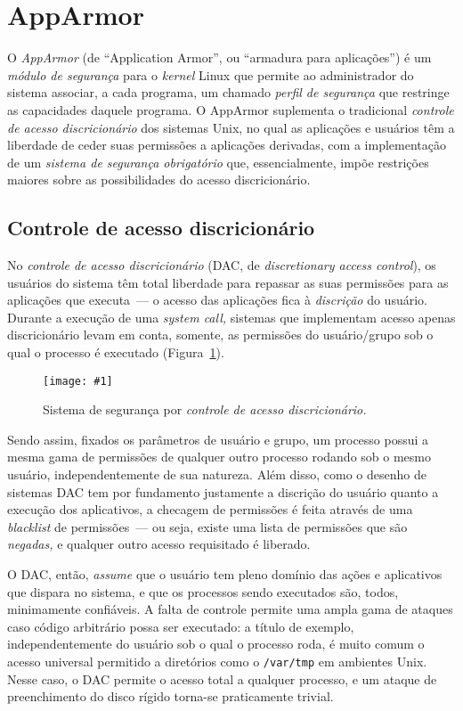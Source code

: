 \documentclass[ruledheader, 12pt]{abnt}
\newcommand{\figcustom}[4]{\par
	\begin{figure}[#3]
		\centering
		\texttt{[image: \#1]}
		\caption{\label{fig:#1}#2}
	\end{figure}
\par}
\newcommand{\figref}[1]{(Figura~\ref{fig:#1})}
\begin{document}
\section{AppArmor}

O \emph{AppArmor} (de ``Application Armor'', ou ``armadura para aplicações'') é um \emph{módulo de segurança} para o \emph{kernel} Linux que permite ao administrador do sistema associar, a cada programa, um chamado \emph{perfil de segurança} que restringe as capacidades daquele programa. O AppArmor suplementa o tradicional \emph{controle de acesso discricionário} dos sistemas Unix, no qual as aplicações e usuários têm a liberdade de ceder suas permissões a aplicações derivadas, com a implementação de um \emph{sistema de segurança obrigatório} que, essencialmente, impõe restrições maiores sobre as possibilidades do acesso discricionário.


\subsection{Controle de acesso discricionário}

No \emph{controle de acesso discricionário} (DAC, de \emph{discretionary access control}), os usuários do sistema têm total liberdade para repassar as suas permissões para as aplicações que executa~--- o acesso das aplicações fica à \emph{discrição} do usuário. Durante a execução de uma \emph{system call,} sistemas que implementam acesso apenas discricionário levam em conta, somente, as permissões do usuário/grupo sob o qual o processo é executado \figref{syscalls-dac}. 

\figcustom{syscalls-dac}{Sistema de segurança por \emph{controle de acesso discricionário.}}{tp}{.8}

Sendo assim, fixados os parâmetros de usuário e grupo, um processo possui a mesma gama de permissões de qualquer outro processo rodando sob o mesmo usuário, independentemente de sua natureza. Além disso, como o desenho de sistemas DAC tem por fundamento justamente a discrição do usuário quanto a execução dos aplicativos, a checagem de permissões é feita através de uma \emph{blacklist} de permissões~--- ou seja, existe uma lista de permissões que são \emph{negadas,} e qualquer outro acesso requisitado é liberado.

O DAC, então, \emph{assume} que o usuário tem pleno domínio das ações e aplicativos que dispara no sistema, e que os processos sendo executados são, todos, minimamente confiáveis. A falta de controle permite uma ampla gama de ataques caso código arbitrário possa ser executado: a título de exemplo, independentemente do usuário sob o qual o processo roda, é muito comum o acesso universal permitido a diretórios como o \verb|/var/tmp| em ambientes Unix. Nesse caso, o DAC permite o acesso total a qualquer processo, e um ataque de preenchimento do disco rígido torna-se praticamente trivial.
\end{document}
